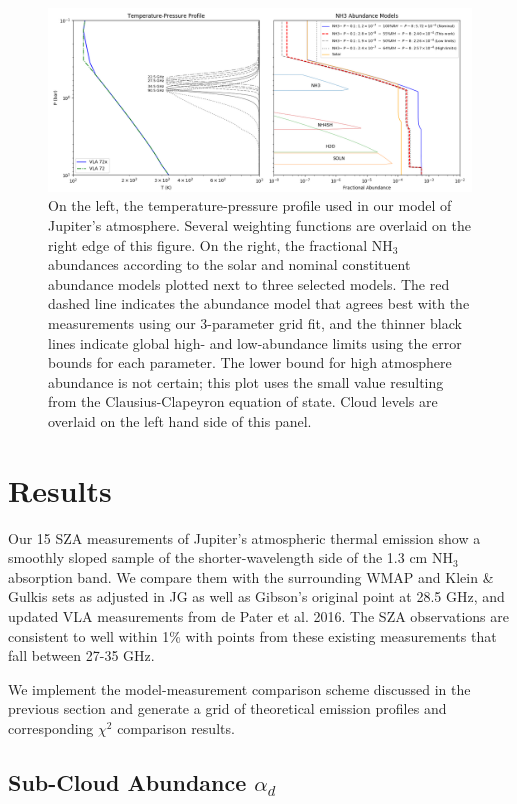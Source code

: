 \documentclass{article}
\begin{document}
	\begin{figure}
		\centering
		\includegraphics[width=\textwidth]{final_tp_const.png}
		\caption{\label{fig:tp}On the left, the temperature-pressure profile used in our model of Jupiter's atmosphere. Several weighting functions are overlaid on the right edge of this figure. On the right, the fractional NH$_{3}$ abundances according to the solar and nominal constituent abundance models plotted next to three selected models. The red dashed line indicates the abundance model that agrees best with the measurements using our 3-parameter grid fit, and the thinner black lines indicate global high- and low-abundance limits using the error bounds for each parameter. The lower bound for high atmosphere abundance is not certain; this plot uses the small value resulting from the Clausius-Clapeyron equation of state. Cloud levels are overlaid on the left hand side of this panel.}
	\end{figure}


\section{Results} \label{s:results}

	Our 15 SZA measurements of Jupiter's atmospheric thermal emission show a smoothly sloped sample of the shorter-wavelength side of the 1.3 cm NH$_{3}$ absorption band.
	We compare them with the surrounding WMAP and Klein \& Gulkis sets as adjusted in JG as well as Gibson's original point at 28.5 GHz, and updated VLA measurements from de Pater et al. 2016.
	The SZA observations are consistent to well within 1\% with points from these existing measurements that fall between 27-35 GHz.

	We implement the model-measurement comparison scheme discussed in the previous section and generate a grid of theoretical emission profiles and corresponding $\chi^{2}$ comparison results.

\subsection{Sub-Cloud Abundance $\alpha_{d}$}
\end{document}
